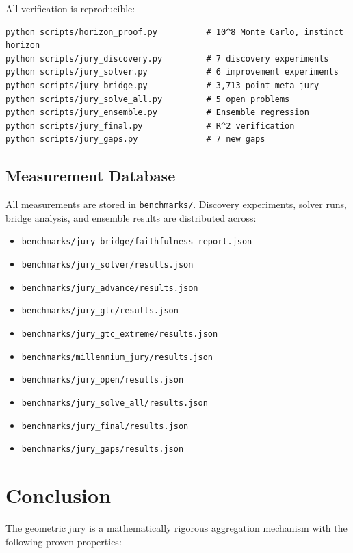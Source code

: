 \documentclass[11pt]{article}
\begin{document}
All verification is reproducible:

\begin{verbatim}
python scripts/horizon_proof.py          # 10^8 Monte Carlo, instinct horizon
python scripts/jury_discovery.py         # 7 discovery experiments
python scripts/jury_solver.py            # 6 improvement experiments
python scripts/jury_bridge.py            # 3,713-point meta-jury
python scripts/jury_solve_all.py         # 5 open problems
python scripts/jury_ensemble.py          # Ensemble regression
python scripts/jury_final.py             # R^2 verification
python scripts/jury_gaps.py              # 7 new gaps
\end{verbatim}

\subsection{Measurement Database}

All measurements are stored in \texttt{benchmarks/}. Discovery experiments,
solver runs, bridge analysis, and ensemble results are distributed across:
\begin{itemize}[nosep]
\item \texttt{benchmarks/jury\_bridge/faithfulness\_report.json}
\item \texttt{benchmarks/jury\_solver/results.json}
\item \texttt{benchmarks/jury\_advance/results.json}
\item \texttt{benchmarks/jury\_gtc/results.json}
\item \texttt{benchmarks/jury\_gtc\_extreme/results.json}
\item \texttt{benchmarks/millennium\_jury/results.json}
\item \texttt{benchmarks/jury\_open/results.json}
\item \texttt{benchmarks/jury\_solve\_all/results.json}
\item \texttt{benchmarks/jury\_final/results.json}
\item \texttt{benchmarks/jury\_gaps/results.json}
\end{itemize}

\newpage
\section{Conclusion}

The geometric jury is a mathematically rigorous aggregation mechanism with the following proven properties:
\end{document}
